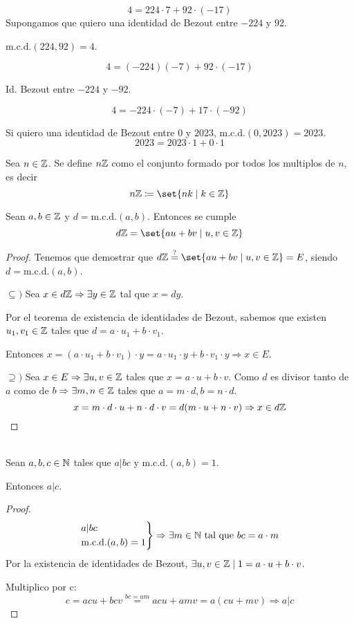 \begin{example}
	\[
		4 = 224 \cdot 7 + 92 \cdot (-17 )
	\]
	Supongamos que quiero una identidad de Bezout entre \(-224 \) y \(92 \).
	
	\(\mathrm{m.c.d.}(224,92) = 4  \).
	
	\[
		4 = (-224)(-7) + 92 \cdot (-17)
	\]
	
	Id. Bezout entre \(-224 \) y \(-92\).
	
	\[4 = -224 \cdot (-7) + 17 \cdot (-92)\]
	
	
	Si quiero una identidad de Bezout entre \(0 \) y \(2023 \), \(\mathrm{m.c.d.}(0,2023) = 2023 \).
	\[
		2023 = 2023 \cdot 1 + 0 \cdot 1
	\]
\end{example}

Sea \(n \in \mathbb{Z} \). Se define \(n\mathbb{Z} \) como el conjunto formado por todos los multiplos de \(n \), es decir
\[
	n\Z \coloneqq \set{nk \mid k \in \Z }
\]

\begin{theorem}
	Sean \(a,b \in \mathbb{Z} \) y \(d = \mathrm{m.c.d.}(a,b) \). Entonces se cumple
	\[
		d\Z =\set{au + bv \mid u,v \in  \Z }
	\]
\end{theorem}
\begin{proof}
	Tenemos que demostrar que \(d\Z \overset{?}{=} \set{au + bv \mid u,v \in \Z } = E\), siendo \(d = \mathrm{m.c.d.}(a,b) \).
	
	\(\subseteq ) \) Sea \(x \in d\mathbb{Z} \Rightarrow \exists y \in \mathbb{Z}\) tal que \(x = dy \).
	
	Por el teorema de existencia de identidades de Bezout, sabemos que existen \(u_1, v_1 \in \mathbb{Z} \) tales que \(d = a \cdot u_1 + b \cdot v_1\).
	
	Entonces \(x = (a \cdot u_1 + b \cdot v_1) \cdot y = a \cdot u_1 \cdot y + b \cdot v_1 \cdot y \Rightarrow x \in E\).
	
	\(\supseteq )\) Sea \(x \in E \Rightarrow \exists u,v \in \mathbb{Z} \) tales que \(x = a \cdot u + b \cdot v\). Como \(d \) es divisor tanto de \(a  \) como de \(b \Rightarrow \exists m,n \in \mathbb{Z} \) tales que \(a = m \cdot d, b = n \cdot d \).
	\[
		x = m \cdot d \cdot u + n \cdot d \cdot v = d (m \cdot u + n \cdot v ) \Rightarrow x \in d\mathbb{Z}
	\]
\end{proof}

\begin{lemma}[de Euclides]
	~ \\ Sean \(a,b,c \in \mathbb{N} \) tales que \(a|bc \) y \(\mathrm{m.c.d.}(a,b) = 1 \).
	
	Entonces \(a|c \).
\end{lemma}
\begin{proof}
	\[
		\begin{rcases}
			a|bc \\
			\mathrm{m.c.d.}(a,b) = 1
		\end{rcases} \Rightarrow \exists m \in \mathbb{N} \text{ tal que } bc = a \cdot m
	\]
	Por la existencia de identidades de Bezout, \(\exists u,v \in \mathbb{Z} \mid 1 = a \cdot u + b \cdot v \).
	
	Multiplico por c:
	\[
		c = acu + bcv \overset{bc=am}{=} acu + amv = a(cu + mv) \Rightarrow a|c
	\]
\end{proof}

